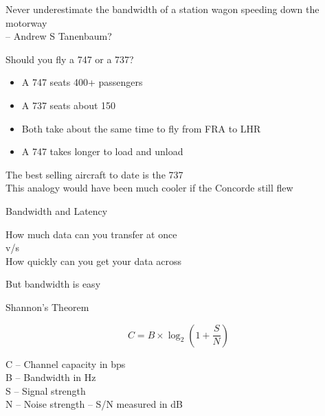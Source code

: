 \documentclass{beamer}
\begin{document}
\begin{frame}
  \titlepage
\end{frame}

\begin{frame}{}
\begin{center}
Never underestimate the bandwidth of a station wagon speeding down the motorway \\
\tiny{-- Andrew S Tanenbaum?}
\end{center}
\end{frame}

\begin{frame}{Should you fly a 747 or a 737?}
  \begin{itemize}
  \item A 747 seats 400+ passengers
  \item A 737 seats about 150
  \item Both take about the same time to fly from FRA to LHR
  \item A 747 takes longer to load and unload
  \end{itemize}
  \vfill
  \tiny{The best selling aircraft to date is the 737 \\ This analogy would have been much cooler if the Concorde still flew}
\end{frame}

\begin{frame}{Bandwidth and Latency}
  \begin{center}
  How much data can you transfer at once \\ v/s \\ How quickly can you get your data across
  \end{center}
\end{frame}

\begin{frame}{}
  \begin{block}{}
  \begin{center}
  But bandwidth is easy
  \end{center}
  \end{block}
\end{frame}

\begin{frame}{Shannon's Theorem}
  \begin{center}
  \[ C = B \times \log_2(1+\frac{S}{N}) \]
  \end{center}
  \vfill
  \small{
  C -- Channel capacity in bps \\
  B -- Bandwidth in Hz \\
  S -- Signal strength \\
  N -- Noise strength -- S/N measured in dB
  }
\end{frame}
\end{document}
